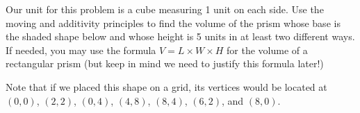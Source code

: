 \documentclass[noauthor,nooutcomes, handout]{ximera}
\begin{document}
\begin{problem}
Our unit for this problem is a cube measuring 1 unit on each side. Use the moving and additivity principles to find the volume of the prism whose base is the shaded shape below and whose height is 5 units in at least two different ways. If needed, you may use the formula $V = L \times W \times H$ for the volume of a rectangular prism (but keep in mind we need to justify this formula later!)

Note that if we placed this shape on a grid, its vertices would be located at $(0,0)$, $(2,2)$, $(0,4)$, $(4,8)$, $(8,4)$, $(6,2)$, and $(8,0)$.

\begin{center}
\end{center}

\end{problem}

\newpage
\end{document}

